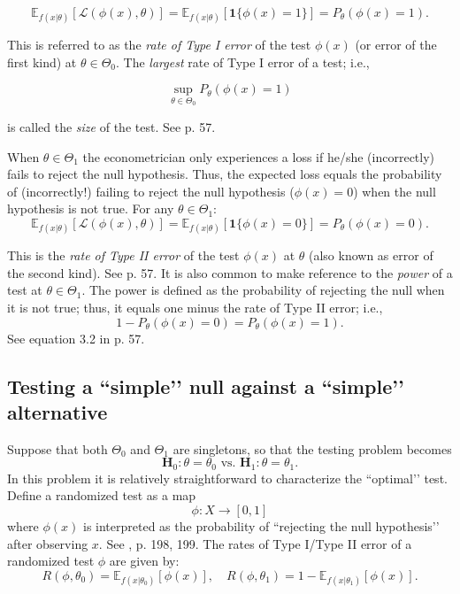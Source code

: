 \documentclass[11pt]{article} %
\begin{document}
\begin{equation} \label{equation:TypeI}
\mathbb{E}_{f(x|\theta)} [  \mathcal{L}(\phi(x),\theta)   ] = \mathbb{E}_{f(x|\theta)} [ \mathbf{1}\{\phi(x)=1\}   ] = P_{\theta}(\phi(x)=1) .
\end{equation}


\noindent This is referred to as the \emph{rate of Type I error} of the test $\phi(x)$ (or error of the first kind)  at $\theta \in \Theta_0$. The \emph{largest} rate of Type I error of a test; i.e., 

\[ \sup_{\theta \in \Theta_0} P_{\theta}(\phi(x)=1)  \]  

\noindent is called the \emph{size} of the test. See \cite{Lehman05} p. 57. 




When $\theta \in \Theta_1$ the econometrician only experiences a loss if he/she (incorrectly) fails to reject the null hypothesis. Thus, the expected loss equals the probability of (incorrectly!) failing to reject the null hypothesis ($\phi(x)=0$) when the null hypothesis is not true. For any $\theta \in \Theta_1$: 
\begin{equation} \label{equation:TypeII}
\mathbb{E}_{f(x|\theta)} [  \mathcal{L}(\phi(x),\theta)   ] = \mathbb{E}_{f(x|\theta)} [ \mathbf{1}\{\phi(x)=0\}   ] = P_{\theta}(\phi(x)=0) .
\end{equation}

\noindent This is the \emph{rate of Type II error} of the test $\phi(x)$ at $\theta$ (also known as error of the second kind). See \cite{Lehman05} p. 57.  It is also common to make reference to the \emph{power} of a test at $\theta \in \Theta_1$. The power is defined as the probability of rejecting the null when it is not true; thus, it equals one minus the rate of Type II error; i.e., 
\[ 1- P_{\theta} (\phi(x)=0) = P_{\theta}(\phi(x)=1). \]
See equation 3.2 in \cite{Lehman05} p. 57.

\subsection{Testing a ``simple’’ null against a ``simple’’ alternative}

Suppose that both $\Theta_0$ and $\Theta_1$ are singletons, so that the testing problem becomes 
\[ \textbf{H}_0: \theta=\theta_0 \textrm{ vs. }  \textbf{H}_1: \theta=\theta_1. \]
In this problem it is relatively straightforward to characterize the ``optimal’’ test. Define a randomized test as a map 
$$\phi:X \rightarrow [0,1]$$
\noindent where $\phi(x)$ is interpreted as the probability of ``rejecting the null hypothesis’’ after observing $x$. See \cite{Ferguson67}, p. 198, 199. The rates of Type I/Type II error of a randomized test $\phi$ are given by:
\[ R(\phi,\theta_0) = \mathbb{E}_{f(x|\theta_0)}[\phi(x)], \quad R(\phi,\theta_1) = 1-\mathbb{E}_{f(x|\theta_1)}[\phi(x)]. \]
\end{document}
